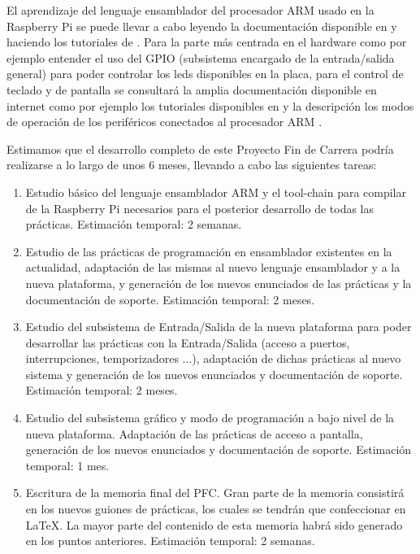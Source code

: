El aprendizaje del lenguaje ensamblador del procesador ARM usado en la Raspberry Pi
se puede llevar a cabo leyendo la documentación disponible en \cite{DATH}
y haciendo los tutoriales de \cite{TASM}.
Para la parte más centrada en el hardware como por ejemplo entender el uso del GPIO
(subsistema encargado de la entrada/salida general) para poder controlar los leds
disponibles en la placa, para el control de teclado y de pantalla se consultará la
amplia documentación disponible en internet como por ejemplo los tutoriales disponibles en
\cite{BKPI}
y la descripción los modos de operación de los periféricos conectados al procesador ARM
\cite{ARMP}.

Estimamos que el desarrollo completo de este Proyecto Fin de Carrera podría realizarse
a lo largo de unos 6 meses, llevando a cabo las siguientes tareas:

\begin{enumerate}
  \item Estudio básico del lenguaje ensamblador ARM y el tool-chain para compilar de la
        Raspberry Pi necesarios para el posterior desarrollo de todas las prácticas. 
        Estimación temporal: 2 semanas.

  \item Estudio de las prácticas de programación en ensamblador existentes en la actualidad,
        adaptación de las mismas al nuevo lenguaje ensamblador y a la nueva plataforma,
        y generación de los nuevos enunciados de las prácticas y la documentación de soporte. 
        Estimación temporal: 2 meses.

  \item Estudio del subsistema de Entrada/Salida de la nueva plataforma para poder desarrollar
        las prácticas con la Entrada/Salida (acceso a puertos, interrupciones, temporizadores
        ...), adaptación de dichas prácticas al nuevo sistema y generación de los nuevos
        enunciados y documentación de soporte. 
        Estimación temporal: 2 meses.

  \item Estudio del subsistema gráfico y modo de programación a bajo nivel de la nueva
        plataforma. Adaptación de las prácticas de acceso a pantalla, generación de los
        nuevos enunciados y documentación de soporte. 
        Estimación temporal: 1 mes.

  \item Escritura de la memoria final del PFC. Gran parte de la memoria consistirá en los
        nuevos guiones de prácticas, los cuales se tendrán que confeccionar en LaTeX. La
        mayor parte del contenido de esta memoria habrá sido generado en los puntos anteriores.
        Estimación temporal: 2 semanas.
\end{enumerate}

